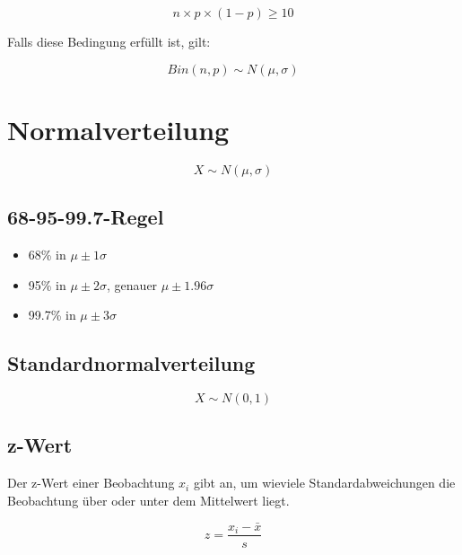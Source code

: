 \documentclass[
]{book}
\providecommand{\tightlist}{%
  \setlength{\itemsep}{0pt}\setlength{\parskip}{0pt}}
\begin{document}
\[n \times p \times (1-p) \geq 10\]

Falls diese Bedingung erfüllt ist, gilt:

\begin{equation}
  Bin(n, p) \sim N(\mu, \sigma)
  \label{eq:binomnormapprox}
\end{equation}

\hypertarget{normalverteilung}{%
\section{Normalverteilung}\label{normalverteilung}}

\begin{equation}
  X \sim N(\mu, \sigma)
  \label{eq:normdistr}
\end{equation}

\hypertarget{regel}{%
\subsection{68-95-99.7-Regel}\label{regel}}

\begin{itemize}
\tightlist
\item
  68\% in \(\mu \pm 1\sigma\)\\
\item
  95\% in \(\mu \pm 2\sigma\), genauer \(\mu \pm 1.96\sigma\)\\
\item
  99.7\% in \(\mu \pm 3\sigma\)
\end{itemize}

\hypertarget{standardnormalverteilung}{%
\subsection{Standardnormalverteilung}\label{standardnormalverteilung}}

\begin{equation}
  X \sim N(0, 1)
  \label{eq:stdnormdistr}
\end{equation}

\hypertarget{z-wert}{%
\subsection{z-Wert}\label{z-wert}}

Der z-Wert einer Beobachtung \(x_i\) gibt an, um wieviele Standardabweichungen die Beobachtung über oder unter dem Mittelwert liegt.

\begin{equation}
  z = \frac{x_i-\bar{x}}{s}
  \label{eq:zvalue}
\end{equation}
\end{document}
